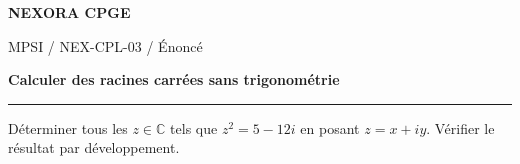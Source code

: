 \documentclass[11pt,a4paper]{article}
\begin{document}
{\small\bfseries\color{nexorablue} NEXORA CPGE}\par
{\small MPSI / NEX-CPL-03 / Énoncé}\par
{\LARGE\bfseries Calculer des racines carrées sans trigonométrie}\par
\vspace{0.25em}\hrule\vspace{0.6em}

Déterminer tous les $z\in\mathbb C$ tels que $z^2=5-12i$ en posant $z=x+iy$. Vérifier le résultat par développement.
\end{document}
